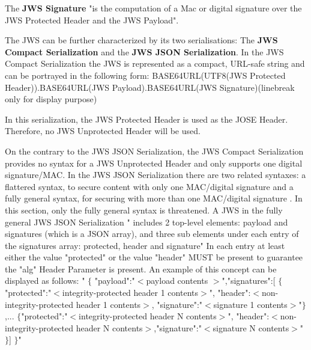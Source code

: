 The \textbf{JWS Signature} "is the computation of a Mac or digital signature over the JWS Protected Header and the JWS Payload".\cite{rfc7515}\newline 

The JWS can be further characterized by its two serialisations: The \textbf{JWS Compact Serialization} and the \textbf{JWS JSON Serialization}. 
In the JWS Compact Serialization the JWS is represented as a compact, URL-safe string \cite{rfc7515} and can be portrayed in the following form:\newline    
BASE64URL(UTF8(JWS Protected Header))\newline.BASE64URL(JWS Payload).BASE64URL(JWS Signature)\cite{Dummies}(linebreak only for display purpose)


In this serialization, the JWS Protected Header is used as the JOSE Header. Therefore, no JWS Unprotected Header will be used.

On the contrary to the JWS JSON Serialization, the JWS Compact Serialization provides no syntax for a JWS Unprotected Header and only supports one digital signature/MAC.
In the JWS JSON Serialization there are two related syntaxes: a flattered syntax, to secure content with only one MAC/digital signature and a fully general syntax, for securing with more than one MAC/digital signature \cite{rfc7515}. In this section, only the fully general syntax is threatened. 
A JWS in the fully general JWS JSON Serialization " includes 2 top-level elements: payload and signatures (which is a JSON array), and three sub elements under each entry of the signatures array: protected, header and signature"\cite{Dummies}
In each entry at least either the value "protected" or the value "header" MUST be present to guarantee the "alg" Header Parameter is present.\cite{rfc7515}\newline
An example of this concept can be displayed as follows:\newline 
	" $\{$ "payload":"$<$payload contents $>$",\newline    "signatures":[\newline
   $\{$"protected":"$<$integrity-protected header 1 contents$>$",\newline
   "header":$<$non-integrity-protected header 1 contents$>$, \newline
   "signature":"$<$signature 1 contents$>$"$\}$,\newline ...\newline
   $\{$"protected":"$<$integrity-protected header N contents$>$",\newline
   "header":$<$non-integrity-protected header N contents$>$,\newline"signature":"$<$signature N contents$>$"$\}$] \newline    $\}$" \cite{rfc7515}

